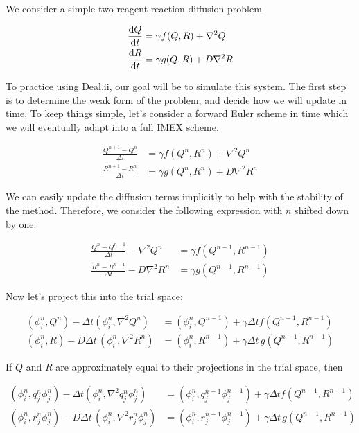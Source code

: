 \documentclass{article}
\begin{document}
We consider a simple two reagent reaction diffusion problem

\begin{align}
    \diff{Q}{t} &= \gamma f(Q,R) + \nabla^2 Q\\
    \diff{R}{t} &= \gamma g(Q,R) + D\nabla^2 R
\end{align}

To practice using Deal.ii, our goal will be to simulate this system. The first
step is to determine the weak form of the problem, and decide how we will update
in time. To keep things simple, let's consider a forward Euler scheme in time
which we will eventually adapt into a full IMEX scheme.

\begin{align}
    \frac{Q^{n+1}-Q^n}{\Delta t} &= \gamma f(Q^n, R^n) + \nabla^2 Q^n\\
    \frac{R^{n+1}-R^n}{\Delta t} &= \gamma g(Q^n, R^n) + D\nabla^2 R^n
\end{align}

We can easily update the diffusion terms implicitly to help with the stability
of the method. Therefore, we consider the following expression with $n$ shifted
down by one:

\begin{align}
    \frac{Q^{n}-Q^{n-1}}{\Delta t} - \nabla^2 Q^{n}  &= \gamma f(Q^{n-1}, R^{n-1})\\
    \frac{R^{n}-R^{n-1}}{\Delta t} - D\nabla^2 R^{n} &= \gamma g(Q^{n-1}, R^{n-1})
\end{align}

Now let's project this into the trial space:

\begin{align}
    (\phi_i^{n}, Q^{n}) - \Delta t (\phi_i^{n}, \nabla^2 Q^n)
    &= (\phi_i^n, Q^{n-1}) + \gamma \Delta t f(Q^{n-1}, R^{n-1})\\
    (\phi_i^n, R) - D\Delta t\, (\phi_i^n,\nabla^2 R^n)
    &= (\phi_i^n, R^{n-1}) + \gamma \Delta t\, g(Q^{n-1}, R^{n-1})
\end{align}

If $Q$ and $R$ are approximately equal to their projections in the trial space,
then

\begin{align}
    (\phi_i^{n}, q_j^n\phi_j^{n}) - \Delta t (\phi_i^{n}, \nabla^2 q_j^n \phi_j^n)
    &= (\phi_i^n, q_j^{n-1}\phi_j^{n-1}) + \gamma \Delta t f(Q^{n-1}, R^{n-1})\\
    (\phi_i^n, r_j^n \phi_j^n) - D\Delta t\, (\phi_i^n,\nabla^2 r_j^{n}\phi_j^n)
    &= (\phi_i^n, r_j^{n-1}\phi_j^{n-1}) + \gamma \Delta t\, g(Q^{n-1}, R^{n-1})
\end{align}
\end{document}
